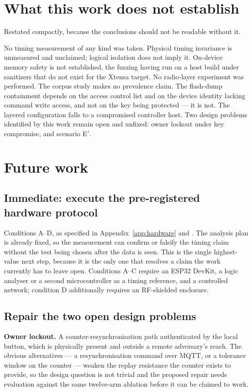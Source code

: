 \section{What this work does not establish}

Restated compactly, because the conclusions should not be readable without it.

No timing measurement of any kind was taken. Physical timing invariance is unmeasured and
unclaimed; logical isolation does not imply it. On-device memory safety is not established, the
fuzzing having run on a host build under sanitizers that do not exist for the Xtensa target. No
radio-layer experiment was performed. The corpus study makes no prevalence claim. The flash-dump
containment depends on the access control list and on the device identity lacking command write
access, and not on the key being protected --- it is not. The layered configuration falls to a
compromised controller host. Two design problems identified by this work remain open and
unfixed: owner lockout under key compromise, and scenario E$'$.

\section{Future work}

\subsection{Immediate: execute the pre-registered hardware protocol}

Conditions A--D, as specified in Appendix~\ref{app:hardware} and
. The analysis plan is already fixed, so the measurement
can confirm or falsify the timing claim without the test being chosen after the data is seen. This
is the single highest-value next step, because it is the only one that resolves a claim the work
currently has to leave open. Conditions A--C require an ESP32 DevKit, a logic analyser or a second
microcontroller as a timing reference, and a controlled network; condition D additionally requires
an RF-shielded enclosure.

\subsection{Repair the two open design problems}

\textbf{Owner lockout.} A counter-resynchronisation path authenticated by the local button, which
is physically present and outside a remote adversary's reach. The obvious alternatives --- a
resynchronisation command over MQTT, or a tolerance window on the counter --- weaken the replay
resistance the counter exists to provide, so the design question is not trivial and the proposed
repair needs evaluation against the same twelve-arm ablation before it can be claimed to work.

